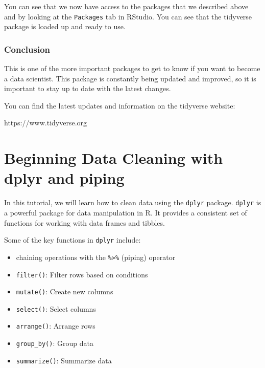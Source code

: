 \documentclass[
  letterpaper,
  DIV=11,
  numbers=noendperiod]{scrreprt}
\providecommand{\tightlist}{%
  \setlength{\itemsep}{0pt}\setlength{\parskip}{0pt}}\usepackage{longtable,booktabs,array}
\begin{document}
You can see that we now have access to the packages that we described
above and by looking at the \texttt{Packages} tab in RStudio. You can
see that the tidyverse package is loaded up and ready to use.

\subsection*{Conclusion}\label{conclusion-5}

This is one of the more important packages to get to know if you want to
become a data scientist. This package is constantly being updated and
improved, so it is important to stay up to date with the latest changes.

You can find the latest updates and information on the tidyverse
website:

https://www.tidyverse.org


\chapter*{Beginning Data Cleaning with dplyr and
piping}\label{beginning-data-cleaning-with-dplyr-and-piping}


In this tutorial, we will learn how to clean data using the
\texttt{dplyr} package. \texttt{dplyr} is a powerful package for data
manipulation in R. It provides a consistent set of functions for working
with data frames and tibbles.

Some of the key functions in \texttt{dplyr} include:

\begin{itemize}
\tightlist
\item
  chaining operations with the \texttt{\%\textgreater{}\%} (piping)
  operator
\item
  \texttt{filter()}: Filter rows based on conditions
\item
  \texttt{mutate()}: Create new columns
\item
  \texttt{select()}: Select columns
\item
  \texttt{arrange()}: Arrange rows
\item
  \texttt{group\_by()}: Group data
\item
  \texttt{summarize()}: Summarize data
\end{itemize}
\end{document}
